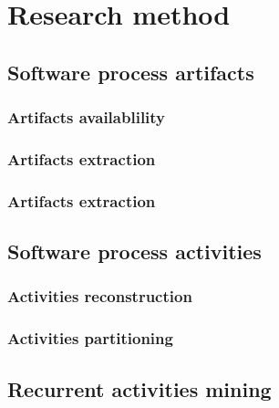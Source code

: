 \chapter{Research method}
\section{Software process artifacts}
\subsection{Artifacts availablility}
\subsection{Artifacts extraction}
\subsection{Artifacts extraction}
\section{Software process activities}
\subsection{Activities reconstruction}
\subsection{Activities partitioning}
\section{Recurrent activities mining}